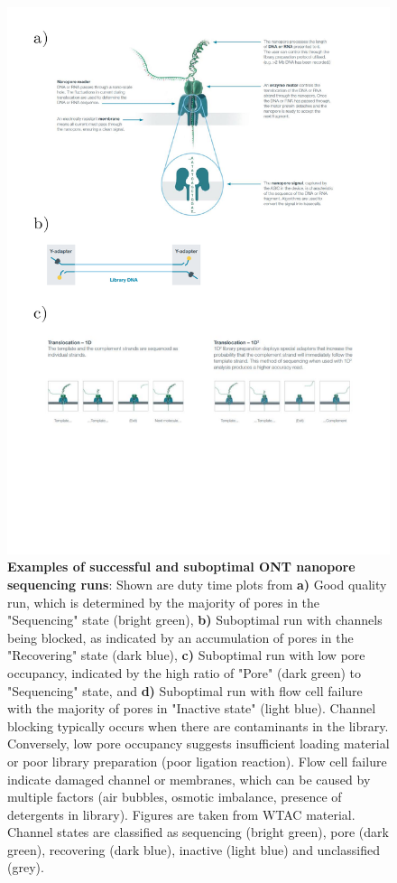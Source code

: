 \begin{figure}[]
	\centering
	\includegraphics[page=6,trim={0 14cm 0 0 },clip, scale = 0.8]{Figures/ProjectDevelopment_FiguresONT}
	\captionsetup{width=0.95\textwidth}
	\caption[Examples of successful and suboptimal ONT nanopore sequencing runs]%
	{\textbf{Examples of successful and suboptimal ONT nanopore sequencing runs}: Shown are duty time plots from \textbf{a)} Good quality run, which is determined by the majority of pores in the "Sequencing" state (bright green), \textbf{b)} Suboptimal run with channels being blocked, as indicated by an accumulation of pores in the "Recovering" state (dark blue), \textbf{c)} Suboptimal run with low pore occupancy, indicated by the high ratio of "Pore" (dark green) to "Sequencing" state, and \textbf{d)} Suboptimal run with flow cell failure with the majority of pores in "Inactive state" (light blue). Channel blocking typically occurs when there are contaminants in the library. Conversely, low pore occupancy suggests insufficient loading material or poor library preparation (poor ligation reaction). Flow cell failure indicate damaged channel or membranes, which can be caused by multiple factors (air bubbles, osmotic imbalance, presence of detergents in library). Figures are taken from WTAC material. Channel states are classified as sequencing (bright green), pore (dark green), recovering (dark blue), inactive (light blue) and unclassified (grey).}
	\label{fig:ONTPoreOccupancy}
\end{figure}

